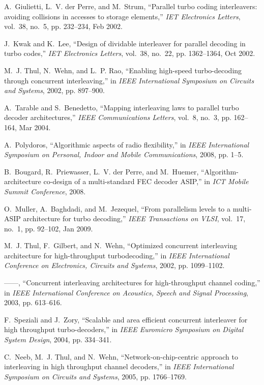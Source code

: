 \documentclass[10pt,twocolumn,journal]{IEEEtran}
\begin{document}
\begin{thebibliography}{10}
A.~Giulietti, L.~V. der Perre, and M.~Strum, ``Parallel turbo coding
  interleavers: avoiding collisions in accesses to storage elements,''
  \emph{IET Electronics Letters}, vol.~38, no.~5, pp. 232--234, Feb 2002.

J.~Kwak and K.~Lee, ``Design of dividable interleaver for parallel decoding in
  turbo codes,'' \emph{IET Electronics Letters}, vol.~38, no.~22, pp.
  1362--1364, Oct 2002.

M.~J. Thul, N.~Wehn, and L.~P. Rao, ``Enabling high-speed turbo-decoding
  through concurrent interleaving,'' in \emph{IEEE International Symposium on
  Circuits and Systems}, 2002, pp. 897--900.

A.~Tarable and S.~Benedetto, ``Mapping interleaving laws to parallel turbo
  decoder architectures,'' \emph{IEEE Communications Letters}, vol.~8, no.~3,
  pp. 162--164, Mar 2004.

A.~Polydoros, ``Algorithmic aspects of radio flexibility,'' in \emph{IEEE
  International Symposium on Personal, Indoor and Mobile Communications}, 2008,
  pp. 1--5.

B.~Bougard, R.~Priewasser, L.~V. der Perre, and M.~Huemer,
  ``Algorithm-architecture co-design of a multi-standard {FEC} decoder
  {ASIP},'' in \emph{ICT Mobile Summit Conference}, 2008.

O.~Muller, A.~Baghdadi, and M.~Jezequel, ``From parallelism levels to a
  multi-{ASIP} architecture for turbo decoding,'' \emph{IEEE Transactions on
  VLSI}, vol.~17, no.~1, pp. 92--102, Jan 2009.

M.~J. Thul, F.~Gilbert, and N.~Wehn, ``Optimized concurrent interleaving
  architecture for high-throughput turbodecoding,'' in \emph{IEEE International
  Conference on Electronics, Circuits and Systems}, 2002, pp. 1099--1102.

------, ``Concurrent interleaving architectures for high-throughput channel
  coding,'' in \emph{IEEE International Conference on Acoustics, Speech and
  Signal Processing}, 2003, pp. 613--616.

F.~Speziali and J.~Zory, ``Scalable and area efficient concurrent interleaver
  for high throughput turbo-decoders,'' in \emph{IEEE Euromicro Symposium on
  Digital System Design}, 2004, pp. 334--341.

C.~Neeb, M.~J. Thul, and N.~Wehn, ``Network-on-chip-centric approach to
  interleaving in high throughput channel decoders,'' in \emph{IEEE
  International Symposium on Circuits and Systems}, 2005, pp. 1766--1769.


\end{thebibliography}
\end{document}
